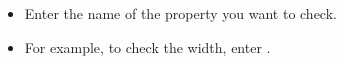 \begin{itemize}
\item Enter the name of the property you want to check.
\item For example, to check the width, enter .
\end{itemize}

